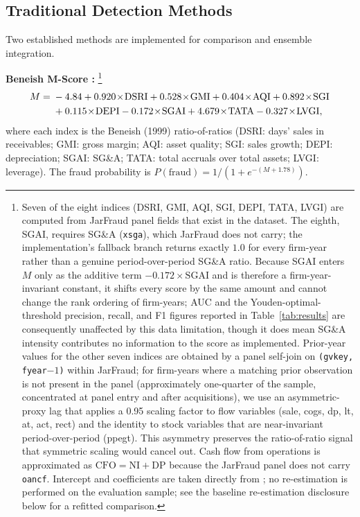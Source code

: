 \documentclass[12pt]{article}
\begin{document}
\subsection*{Traditional Detection Methods}
\label{subsec:traditional}

Two established methods are implemented for comparison and ensemble
integration.

\textbf{Beneish M-Score \citep{beneish1999}:}%
\footnote{Seven of the eight indices (DSRI, GMI, AQI, SGI, DEPI, TATA, LVGI)
are computed from JarFraud panel fields that exist in the dataset.  The
eighth, SGAI, requires SG\&A (\texttt{xsga}), which JarFraud does not carry;
the implementation's fallback branch returns exactly $1.0$ for every
firm-year rather than a genuine period-over-period SG\&A ratio.  Because
SGAI enters $M$ only as the additive term $-0.172\!\times\!\mathrm{SGAI}$
and is therefore a firm-year-invariant constant, it shifts every score by
the same amount and cannot change the rank ordering of firm-years; AUC and
the Youden-optimal-threshold precision, recall, and F1 figures reported in
Table~\ref{tab:results} are consequently unaffected by this data
limitation, though it does mean SG\&A intensity contributes no information
to the score as implemented.  Prior-year values for the other seven
indices are obtained by a panel self-join on \texttt{(gvkey, fyear$-1$)}
within JarFraud; for firm-years where a matching prior observation is not
present in the panel (approximately one-quarter of the sample, concentrated
at panel entry and after acquisitions), we use an asymmetric-proxy lag that
applies a 0.95 scaling factor to flow variables (sale, cogs, dp, lt, at,
act, rect) and the identity to stock variables that are near-invariant
period-over-period (ppegt).  This asymmetry preserves the ratio-of-ratio
signal that symmetric scaling would cancel out.  Cash flow from operations
is approximated as $\mathrm{CFO} = \mathrm{NI} + \mathrm{DP}$ because the
JarFraud panel does not carry \texttt{oancf}.  Intercept and coefficients
are taken directly from \citet{beneish1999}; no re-estimation is performed
on the evaluation sample; see the baseline re-estimation disclosure below
for a refitted comparison.}
\begin{align}
    M = \; &-4.84
      + 0.920\!\times\!\mathrm{DSRI}
      + 0.528\!\times\!\mathrm{GMI}
      + 0.404\!\times\!\mathrm{AQI}
      + 0.892\!\times\!\mathrm{SGI} \notag \\
     &+ 0.115\!\times\!\mathrm{DEPI}
      - 0.172\!\times\!\mathrm{SGAI}
      + 4.679\!\times\!\mathrm{TATA}
      - 0.327\!\times\!\mathrm{LVGI},
\end{align}
where each index is the Beneish (1999) ratio-of-ratios (DSRI: days' sales
in receivables; GMI: gross margin; AQI: asset quality; SGI: sales growth;
DEPI: depreciation; SGAI: SG\&A; TATA: total accruals over total assets;
LVGI: leverage).  The fraud probability is
$P(\text{fraud}) = 1/(1 + e^{-(M+1.78)})$.
\end{document}
